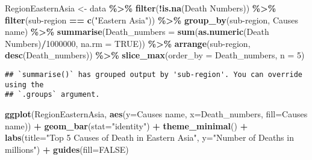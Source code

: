 \documentclass[
]{article}
\newenvironment{Shaded}{\begin{snugshade}}{\end{snugshade}}
\newcommand{\AttributeTok}[1]{\textcolor[rgb]{0.13,0.29,0.53}{#1}}
\newcommand{\ConstantTok}[1]{\textcolor[rgb]{0.56,0.35,0.01}{#1}}
\newcommand{\DecValTok}[1]{\textcolor[rgb]{0.00,0.00,0.81}{#1}}
\newcommand{\FunctionTok}[1]{\textcolor[rgb]{0.13,0.29,0.53}{\textbf{#1}}}
\newcommand{\NormalTok}[1]{#1}
\newcommand{\OtherTok}[1]{\textcolor[rgb]{0.56,0.35,0.01}{#1}}
\newcommand{\SpecialCharTok}[1]{\textcolor[rgb]{0.81,0.36,0.00}{\textbf{#1}}}
\newcommand{\StringTok}[1]{\textcolor[rgb]{0.31,0.60,0.02}{#1}}
\begin{document}
\begin{Shaded}
\begin{Highlighting}[]
\NormalTok{RegionEasternAsia }\OtherTok{\textless{}{-}}\NormalTok{ data }\SpecialCharTok{\%\textgreater{}\%}
  \FunctionTok{filter}\NormalTok{(}\SpecialCharTok{!}\FunctionTok{is.na}\NormalTok{(}\StringTok{\textasciigrave{}}\AttributeTok{Death Numbers}\StringTok{\textasciigrave{}}\NormalTok{)) }\SpecialCharTok{\%\textgreater{}\%}
  \FunctionTok{filter}\NormalTok{(}\StringTok{\textasciigrave{}}\AttributeTok{sub{-}region}\StringTok{\textasciigrave{}} \SpecialCharTok{==} \FunctionTok{c}\NormalTok{(}\StringTok{"Eastern Asia"}\NormalTok{)) }\SpecialCharTok{\%\textgreater{}\%}
  \FunctionTok{group\_by}\NormalTok{(}\StringTok{\textasciigrave{}}\AttributeTok{sub{-}region}\StringTok{\textasciigrave{}}\NormalTok{, }\StringTok{\textasciigrave{}}\AttributeTok{Causes name}\StringTok{\textasciigrave{}}\NormalTok{) }\SpecialCharTok{\%\textgreater{}\%}
  \FunctionTok{summarise}\NormalTok{(}\AttributeTok{Death\_numbers =} \FunctionTok{sum}\NormalTok{(}\FunctionTok{as.numeric}\NormalTok{(}\StringTok{\textasciigrave{}}\AttributeTok{Death Numbers}\StringTok{\textasciigrave{}}\NormalTok{)}\SpecialCharTok{/}\DecValTok{1000000}\NormalTok{, }\AttributeTok{na.rm =} \ConstantTok{TRUE}\NormalTok{)) }\SpecialCharTok{\%\textgreater{}\%}
  \FunctionTok{arrange}\NormalTok{(}\StringTok{\textasciigrave{}}\AttributeTok{sub{-}region}\StringTok{\textasciigrave{}}\NormalTok{, }\FunctionTok{desc}\NormalTok{(Death\_numbers)) }\SpecialCharTok{\%\textgreater{}\%}
  \FunctionTok{slice\_max}\NormalTok{(}\AttributeTok{order\_by =}\NormalTok{ Death\_numbers, }\AttributeTok{n =} \DecValTok{5}\NormalTok{)}
\end{Highlighting}
\end{Shaded}

\begin{verbatim}
## `summarise()` has grouped output by 'sub-region'. You can override using the
## `.groups` argument.
\end{verbatim}

\begin{Shaded}
\begin{Highlighting}[]
\FunctionTok{ggplot}\NormalTok{(RegionEasternAsia, }\FunctionTok{aes}\NormalTok{(}\AttributeTok{y=}\StringTok{\textasciigrave{}}\AttributeTok{Causes name}\StringTok{\textasciigrave{}}\NormalTok{, }\AttributeTok{x=}\NormalTok{Death\_numbers, }\AttributeTok{fill=}\StringTok{\textasciigrave{}}\AttributeTok{Causes name}\StringTok{\textasciigrave{}}\NormalTok{)) }\SpecialCharTok{+}
  \FunctionTok{geom\_bar}\NormalTok{(}\AttributeTok{stat=}\StringTok{"identity"}\NormalTok{) }\SpecialCharTok{+}
  \FunctionTok{theme\_minimal}\NormalTok{() }\SpecialCharTok{+} 
  \FunctionTok{labs}\NormalTok{(}\AttributeTok{title=}\StringTok{"Top 5 Causes of Death in Eastern Asia"}\NormalTok{,}
       \AttributeTok{y=}\StringTok{"Number of Deaths in millions"}\NormalTok{) }\SpecialCharTok{+}
  \FunctionTok{guides}\NormalTok{(}\AttributeTok{fill=}\ConstantTok{FALSE}\NormalTok{)}
\end{Highlighting}
\end{Shaded}
\end{document}
